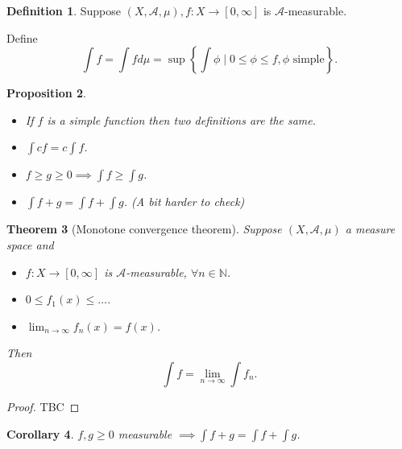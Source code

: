 \documentclass{report}
\newcommand{\N}{\mathbb{N}}
\newcommand{\cA}{\mathcal{A}}
\newtheorem{theorem}{Theorem}[chapter]
\newtheorem{corollary}[theorem]{Corollary}
\newtheorem{proposition}[theorem]{Proposition}
\theoremstyle{definition}
\newtheorem{definition}[theorem]{Definition}
\theoremstyle{remark}
\newcommand{\fnl}{\parbox[t]{0\linewidth}{}}
\begin{document}
\begin{definition}
	Suppose $(X, \cA, \mu), f: X \to [0, \infty]$ is $\cA$-measurable. 

	Define \[
		\int f = \int f d\mu = \sup\left\lbrace \int \phi \mid 0 \leq \phi \leq f, \phi \text{ simple} \right\rbrace.	
	\]
\end{definition}
\begin{proposition}\fnl
	\begin{itemize}
		\item If $f$ is a simple function then two definitions are the same.
		\item $\displaystyle \int cf = c\int f$.
		\item $\displaystyle f \geq g \geq 0 \implies \int f \geq \int g$.
		\item $\displaystyle \int f + g = \int f + \int g$. (A bit harder to check)
	\end{itemize}
\end{proposition}
\begin{theorem}[Monotone convergence theorem]
	Suppose $(X, \cA, \mu)$ a measure space and \begin{itemize}
		\item $f: X \to [0, \infty]$ is $\cA$-measurable, $\forall n \in \N$.
		\item $0 \leq f_1(x) \leq \ldots $.
		\item $\displaystyle \lim_{n \to \infty} f_n(x) = f(x)$.
	\end{itemize}
	Then
	\[
		\int f = \lim_{n \to \infty} \int f_n.	
	\]
\end{theorem}
\begin{proof}
	TBC
\end{proof}
\begin{corollary}
	$f, g \geq 0$ measurable $\displaystyle \implies \int f + g = \int f + \int g$. 
\end{corollary}
\end{document}
